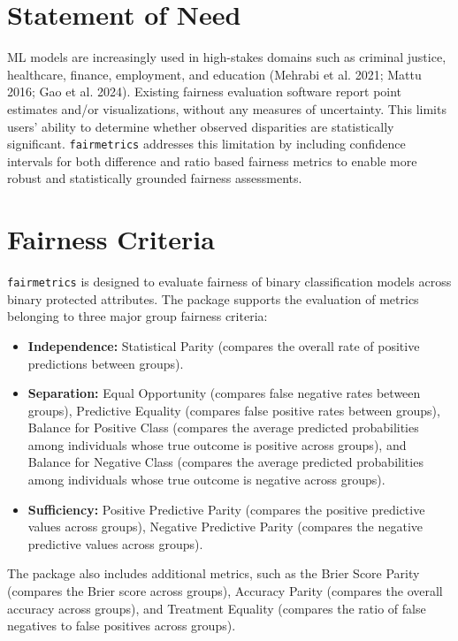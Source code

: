 \documentclass[10pt,a4paper,onecolumn]{article}
\begin{document}
\section{Statement of Need}\label{statement-of-need}

ML models are increasingly used in high-stakes domains such as criminal
justice, healthcare, finance, employment, and education (Mehrabi et al.
2021; Mattu 2016; Gao et al. 2024). Existing fairness evaluation
software report point estimates and/or visualizations, without any
measures of uncertainty. This limits users' ability to determine whether
observed disparities are statistically significant. \texttt{fairmetrics}
addresses this limitation by including confidence intervals for both
difference and ratio based fairness metrics to enable more robust and
statistically grounded fairness assessments.

\section{Fairness Criteria}\label{fairness-criteria}

\texttt{fairmetrics} is designed to evaluate fairness of binary
classification models across binary protected attributes. The package
supports the evaluation of metrics belonging to three major group
fairness criteria:

\begin{itemize}
\item
  \textbf{Independence:} Statistical Parity (compares the overall rate
  of positive predictions between groups).
\item
  \textbf{Separation:} Equal Opportunity (compares false negative rates
  between groups), Predictive Equality (compares false positive rates
  between groups), Balance for Positive Class (compares the average
  predicted probabilities among individuals whose true outcome is
  positive across groups), and Balance for Negative Class (compares the
  average predicted probabilities among individuals whose true outcome
  is negative across groups).
\item
  \textbf{Sufficiency:} Positive Predictive Parity (compares the
  positive predictive values across groups), Negative Predictive Parity
  (compares the negative predictive values across groups).
\end{itemize}

The package also includes additional metrics, such as the Brier Score
Parity (compares the Brier score across groups), Accuracy Parity
(compares the overall accuracy across groups), and Treatment Equality
(compares the ratio of false negatives to false positives across
groups).
\end{document}

